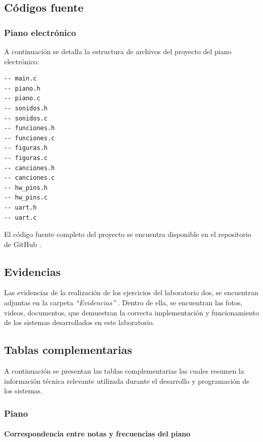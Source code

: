 \subsection{Códigos fuente}

\subsubsection{Piano electrónico}
A continuación se detalla la estructura de archivos del proyecto del piano electrónico:

\begin{verbatim}
-- main.c
-- piano.h
-- piano.c
-- sonidos.h
-- sonidos.c
-- funciones.h
-- funciones.c
-- figuras.h
-- figuras.c
-- canciones.h
-- canciones.c
-- hw_pins.h
-- hw_pins.c
-- uart.h
-- uart.c

\end{verbatim}

El código fuente completo del proyecto se encuentra disponible en el repositorio de GitHub \cite{utec_tecmicro}.

\subsection{Evidencias}

Las evidencias de la realización de los ejercicios del laboratorio dos, se encuentran adjuntas en la carpeta \textit{“Evidencias”} \cite{github_evidencias_lab2}. Dentro de ella, se encuentran las fotos, videos, documentos, que demuestran la correcta implementación y funcionamiento de los sistemas desarrollados en este laboratorio.

\vspace{0.3cm}

\subsection{Tablas complementarias}

A continuación se presentan las tablas complementarias las cuales resumen la información técnica relevante utilizada durante el desarrollo y programación de los sistemas.

\vspace{0.5cm}

\subsubsection{Piano}

\paragraph{Correspondencia entre notas y frecuencias del piano}

